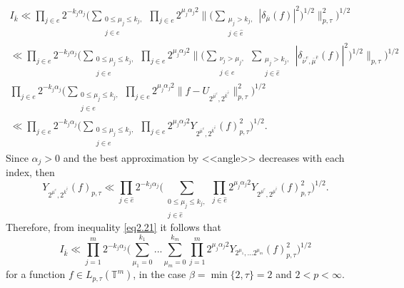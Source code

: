 \documentclass[12pt]{article}
\theoremstyle{plain}
\begin{document}
\begin{multline}\label{eq2.21}
I_{\overline{k}}\ll \prod_{j\in e}2^{-k_{j}\alpha_{j}}\biggl(\sum\limits_{\substack{0\leqslant \mu_{j}\leqslant k_{j}, \\ j\in e}}\prod_{j\in e}2^{\mu_{j}\alpha_{j}2} \biggl\|\biggl(\sum\limits_{\substack{\mu_{j}>k_{j}, \\ j\in \hat{e}}} |\delta_{\overline{\mu}}(f)|^{2}\biggr)^{1/2}\biggr\|_{p, \tau}^{2}\biggr)^{1/2}
\\
\ll \prod_{j\in e}2^{-k_{j}\alpha_{j}}\biggl(\sum\limits_{\substack{0\leqslant \mu_{j}\leqslant k_{j},\\ j\in e}}\prod_{j\in e}2^{\mu_{j}\alpha_{j}2} \biggl\|\biggl(\sum\limits_{\substack{\nu_{j}>\mu_{j}, \\j\in e}}\sum\limits_{\substack{\mu_{j}>k_{j}, \\j\in \hat{e}}} |\delta_{\overline{\nu}^{e}, \overline{\mu}^{\hat{e}}}(f)|^{2}\biggr)^{1/2}\biggr\|_{p, \tau}\biggr)^{1/2}
\\
\prod_{j\in e}2^{-k_{j}\alpha_{j}}\biggl(\sum\limits_{\substack{0\leqslant \mu_{j}\leqslant k_{j},\\ j\in e}}\prod_{j\in e}2^{\mu_{j}\alpha_{j}2} \|f-U_{2^{\overline{\mu}^{e}}, 2^{\overline{k}^{\hat{e}}}}\|_{p, \tau}^{2} \biggr)^{1/2} 
\\
\ll \prod_{j\in e}2^{-k_{j}\alpha_{j}}\biggl(\sum\limits_{\substack{0\leqslant \mu_{j}\leqslant k_{j}, \\ j\in e}}\prod_{j\in e}2^{\mu_{j}\alpha_{j}2} Y_{2^{\overline{\mu}^{e}}, 2^{\overline{k}^{\hat{e}}}}(f)_{p, \tau}^{2} \biggr)^{1/2}.
\end{multline}
Since $\alpha_{j}>0$ and the best approximation by <<angle>> decreases with each index, then
\begin{equation}\label{eq2.22}
Y_{2^{\overline{\mu}^{e}}, 2^{\overline{k}^{\hat{e}}}}(f)_{p, \tau} \ll \prod_{j\in \hat{e}}2^{-k_{j}\alpha_{j}}\biggl(\sum\limits_{\substack{0\leqslant \mu_{j}\leqslant k_{j}, \\ j\in \hat{e}}}\prod_{j\in \hat{e}}2^{\mu_{j}\alpha_{j}2} Y_{2^{\overline{\mu}^{e}}, 2^{\overline{\mu}^{\hat{e}}}}(f)_{p, \tau}^{2} \biggr)^{1/2}.
\end{equation}
Therefore, from inequality \eqref{eq2.21} it follows that
\begin{equation}\label{eq2.23}
I_{\overline{k}}\ll \prod_{j=1}^{m}2^{-k_{j}\alpha_{j}}\biggl(\sum\limits_{\mu_{1}=0}^{k_{1}}...\sum\limits_{\mu_{m}=0}^{k_{m}}\prod_{j=1}^{m}2^{\mu_{j}\alpha_{j}2} Y_{2^{\mu_{1}},... 2^{\mu_{m}}}(f)_{p, \tau}^{2} \biggr)^{1/2}
\end{equation}
for a function  $f\in L_{p, \tau}(\mathbb{T}^{m})$, in the case 
  $\beta = \min\{2, \tau\}=2$ and $2< p< \infty$.
\end{document}
